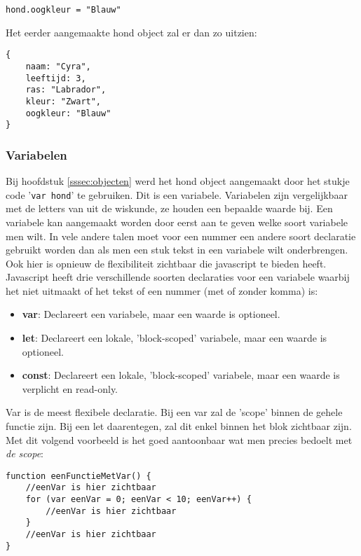 \begin{lstlisting}[frame=single, caption=Eigenschap toevoegen aan een object]
hond.oogkleur = "Blauw"
\end{lstlisting}

Het eerder aangemaakte hond object zal er dan zo uitzien:

\begin{lstlisting}[frame=single, caption=Het nieuwe hond object]
{
	naam: "Cyra",
 	leeftijd: 3,
 	ras: "Labrador",
 	kleur: "Zwart",
 	oogkleur: "Blauw"
}
\end{lstlisting}

\subsubsection{Variabelen}
\label{sssec:variabelen}
Bij hoofdstuk \ref{sssec:objecten} werd het hond object aangemaakt door het stukje code '\lstinline[basicstyle=\ttfamily\color{red}]|var hond|' te gebruiken. Dit is een variabele. Variabelen zijn vergelijkbaar met de letters van uit de wiskunde, ze houden een bepaalde waarde bij. Een variabele kan aangemaakt worden door eerst aan te geven welke soort variabele men wilt. In vele andere talen moet voor een nummer een andere soort declaratie gebruikt worden dan als men een stuk tekst in een variabele wilt onderbrengen. Ook hier is opnieuw de flexibiliteit zichtbaar die javascript te bieden heeft. Javascript heeft drie verschillende soorten declaraties voor een variabele waarbij het niet uitmaakt of het tekst of een nummer (met of zonder komma) is:

\begin{itemize}
	\item \textbf{var}: Declareert een variabele, maar een waarde is optioneel.
	\item \textbf{let}: Declareert een lokale, 'block-scoped' variabele, maar een waarde is optioneel.
	\item \textbf{const}: Declareert een lokale, 'block-scoped' variabele, maar een waarde is verplicht en read-only.
\end{itemize}

Var is de meest flexibele declaratie. Bij een var zal de 'scope' binnen de gehele functie zijn. Bij een let daarentegen, zal dit enkel binnen het blok zichtbaar zijn. Met dit volgend voorbeeld is het goed aantoonbaar wat men precies bedoelt met \textit{de scope}:

\begin{lstlisting}[frame=single, caption=Een functie met var]
function eenFunctieMetVar() {
	//eenVar is hier zichtbaar
	for (var eenVar = 0; eenVar < 10; eenVar++) {
		//eenVar is hier zichtbaar
	}
	//eenVar is hier zichtbaar
}
\end{lstlisting}

